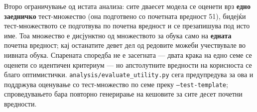 Второ ограничување од истата анализа: сите дваесет модела се оценети врз \textbf{едно заедничко}
тест-множество (она подготвено со почетната вредност 51), бидејќи тест-множеството се
подготвува по почетна вредност и се презапишува под исто име. Тоа множество е дисјунктно од
множеството за обука само на \textbf{едната} почетна вредност; кај останатите девет дел од
редовите можеби учествувале во нивната обука. Спарената споредба не е засегната --- двата крака
на едно семе се оценети со идентичен критериум --- но апстолутните вредности на корисноста се
благо оптимистички. \texttt{analysis/evaluate\_utility.py} сега предупредува за ова и поддржува
оценување со тест-множество по семе преку \texttt{--test-template}; спроведувањето бара повторно
генерирање на кешовите за сите десет почетни вредности.

